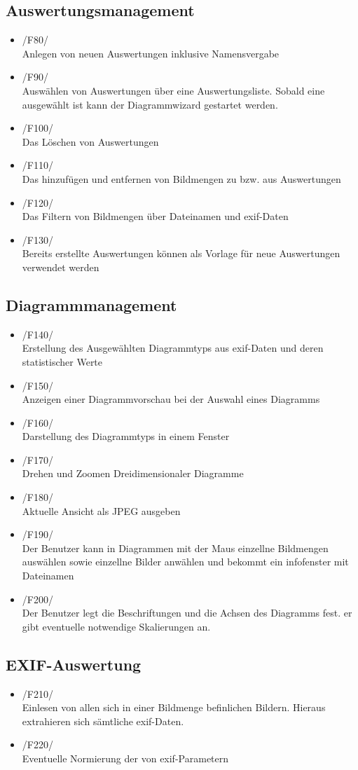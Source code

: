 \subsection{Auswertungsmanagement}
	\begin{itemize}
		\item /F80/\\ Anlegen von neuen Auswertungen inklusive Namensvergabe
		\item /F90/\\ Auswählen von Auswertungen über eine Auswertungsliste. Sobald eine ausgewählt ist kann der Diagrammwizard gestartet werden.
		\item /F100/\\ Das Löschen von Auswertungen
		\item /F110/\\ Das hinzufügen und entfernen von Bildmengen zu bzw. aus Auswertungen
		\item /F120/\\ Das Filtern von Bildmengen über Dateinamen und \gls{exif}-Daten
		\item /F130/\\ Bereits erstellte Auswertungen können als Vorlage für neue Auswertungen verwendet werden
	\end{itemize}

\subsection{Diagrammmanagement}
	\begin{itemize}
		\item /F140/\\ Erstellung des Ausgewählten Diagrammtyps aus \gls{exif}-Daten und deren statistischer Werte
		\item /F150/\\ Anzeigen einer Diagrammvorschau bei der Auswahl eines Diagramms
		\item /F160/\\ Darstellung des Diagrammtyps in einem Fenster
		\item /F170/\\ Drehen und Zoomen Dreidimensionaler Diagramme
		\item /F180/\\ Aktuelle Ansicht als JPEG ausgeben
		\item /F190/\\ Der Benutzer kann in Diagrammen mit der Maus einzellne Bildmengen auswählen sowie einzellne Bilder anwählen und bekommt ein infofenster mit 	Dateinamen	
		\item /F200/\\ Der Benutzer legt die Beschriftungen und die Achsen des Diagramms fest. er gibt eventuelle notwendige Skalierungen an.
	\end{itemize}

\subsection{EXIF-Auswertung}
	\begin{itemize}
		\item /F210/\\ Einlesen von allen sich in einer Bildmenge befinlichen Bildern. Hieraus extrahieren sich sämtliche \gls{exif}-Daten.
		\item /F220/\\ Eventuelle Normierung der von \gls{exif}-Parametern
	\end{itemize}